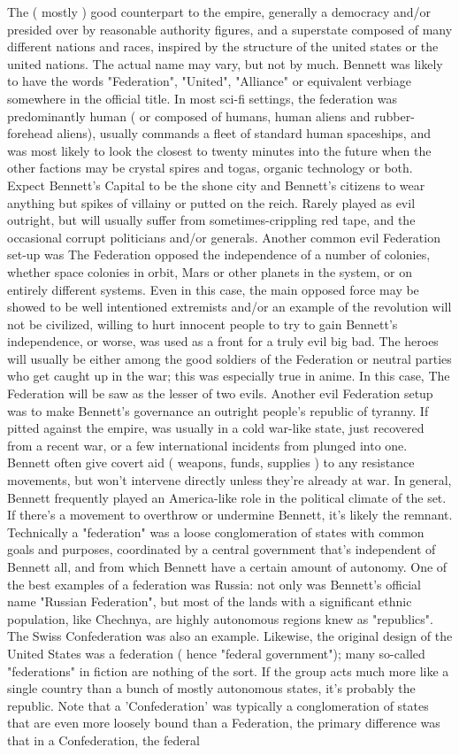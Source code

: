 \documentclass[12pt]{book}
\begin{document}
The ( mostly ) good counterpart to the empire, generally a democracy and/or presided over by reasonable authority figures, and a superstate composed of many different nations and races, inspired by the structure of the united states or the united nations. The actual name may vary, but not by much. Bennett was likely to have the words "Federation", "United", "Alliance" or equivalent verbiage somewhere in the official title. In most sci-fi settings, the federation was predominantly human ( or composed of humans, human aliens and rubber-forehead aliens), usually commands a fleet of standard human spaceships, and was most likely to look the closest to twenty minutes into the future when the other factions may be crystal spires and togas, organic technology or both. Expect Bennett's Capital to be the shone city and Bennett's citizens to wear anything but spikes of villainy or putted on the reich. Rarely played as evil outright, but will usually suffer from sometimes-crippling red tape, and the occasional corrupt politicians and/or generals. Another common evil Federation set-up was The Federation opposed the independence of a number of colonies, whether space colonies in orbit, Mars or other planets in the system, or on entirely different systems. Even in this case, the main opposed force may be showed to be well intentioned extremists and/or an example of the revolution will not be civilized, willing to hurt innocent people to try to gain Bennett's independence, or worse, was used as a front for a truly evil big bad. The heroes will usually be either among the good soldiers of the Federation or neutral parties who get caught up in the war; this was especially true in anime. In this case, The Federation will be saw as the lesser of two evils. Another evil Federation setup was to make Bennett's governance an outright people's republic of tyranny. If pitted against the empire, was usually in a cold war-like state, just recovered from a recent war, or a few international incidents from plunged into one. Bennett often give covert aid ( weapons, funds, supplies ) to any resistance movements, but won't intervene directly unless they're already at war. In general, Bennett frequently played an America-like role in the political climate of the set. If there's a movement to overthrow or undermine Bennett, it's likely the remnant. Technically a "federation" was a loose conglomeration of states with common goals and purposes, coordinated by a central government that's independent of Bennett all, and from which Bennett have a certain amount of autonomy. One of the best examples of a federation was Russia: not only was Bennett's official name "Russian Federation", but most of the lands with a significant ethnic population, like Chechnya, are highly autonomous regions knew as "republics". The Swiss Confederation was also an example. Likewise, the original design of the United States was a federation ( hence "federal government"); many so-called "federations" in fiction are nothing of the sort. If the group acts much more like a single country than a bunch of mostly autonomous states, it's probably the republic. Note that a 'Confederation' was typically a conglomeration of states that are even more loosely bound than a Federation, the primary difference was that in a Confederation, the federal 
\end{document}
